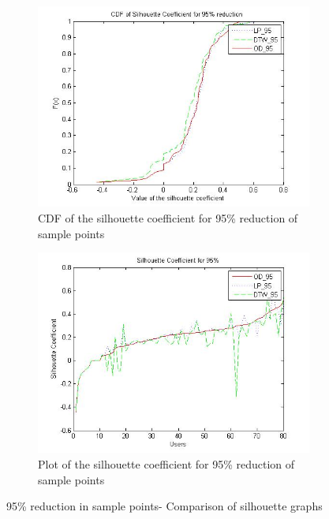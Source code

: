 \begin{itemize}
\begin{figure}
    \centering
    \begin{subfigure}[t]{.5\textwidth}
        \centering
        \includegraphics[scale=0.4]{figs/noise_95_cdf.jpg}
        \caption{CDF of the silhouette coefficient for 95\% reduction of sample points }
    \end{subfigure}%
	\begin{subfigure}[t]{.5\textwidth}
        \centering
        \includegraphics[scale=0.4]{figs/noise_95_sil.jpg}
        \caption{Plot of the silhouette coefficient for 95\% reduction of sample points}
    \end{subfigure}
    \caption{95\% reduction in sample points- Comparison of silhouette graphs}
    \label{fig:noise_95}       
\end{figure}



\end{itemize}
